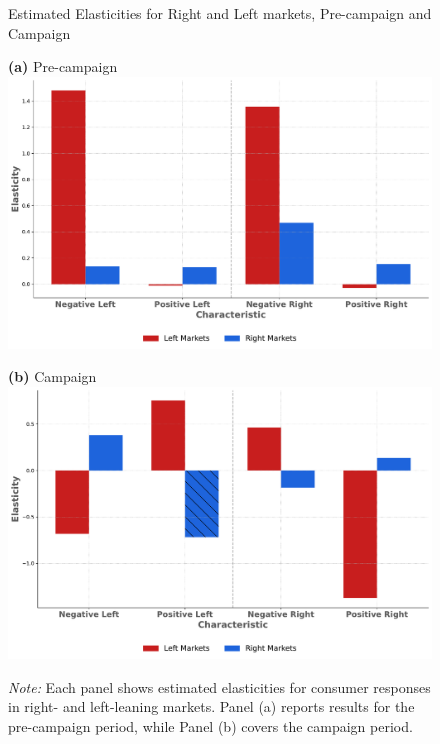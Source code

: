 \documentclass[12pt]{article}
\begin{document}
\begin{figure}[ht]
	\centering
	\caption{Estimated Elasticities for Right and Left markets, Pre-campaign and Campaign}
	
	\vspace{0.5em} %
	
	\begin{minipage}{0.45\textwidth}
		\centering
		\textbf{(a)} Pre-campaign\\
		\includegraphics[width=\linewidth]{figures/elasticities_pre_campaign}
	\end{minipage}
	\hfill
	\begin{minipage}{0.45\textwidth}
		\centering
		\textbf{(b)} Campaign\\
		\includegraphics[width=\linewidth]{figures/elasticities_campaign}
		\label{fig:2figsA}
	\end{minipage}
	
	\vspace{0.5em} %
	
	\captionsetup{justification=justified}
	\caption*{\textit{Note:} \small Each panel shows estimated elasticities for consumer responses in right- and left-leaning markets. Panel (a) reports results for the pre-campaign period, while Panel (b) covers the campaign period.}
\end{figure}
\end{document}
